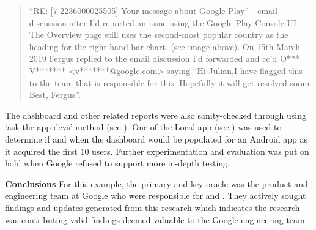 \begin{quote}
    “RE: [7-2236000025505] Your message about Google Play” - email discussion after I’d reported an issue using the Google Play Console UI - The Overview page still uses the second-most popular country as the heading for the right-hand bar chart. (see image above). On 15th March 2019 Fergus replied to the email discussion I’d forwarded and cc’d O*** V******* <v*******@google.com> saying “Hi Julian,I have flagged this to the team that is responsible for this. Hopefully it will get resolved soom\sidenote{[sic]}. Best, Fergus”.

\end{quote}

The dashboard and other related reports were also sanity-checked through using `ask the app devs' method (see ). One of the Local app (see ) was used to determine if and when the dashboard would be populated for an Android app as it acquired the first 10 users. Further experimentation and evaluation was put on hold when Google refused to support more in-depth testing.


\textbf{Conclusions}
For this example, the primary and key oracle was the product and engineering team at Google who were responsible for  and . They actively sought findings and updates generated from this research which indicates the research was contributing valid findings deemed valuable to the Google engineering team.